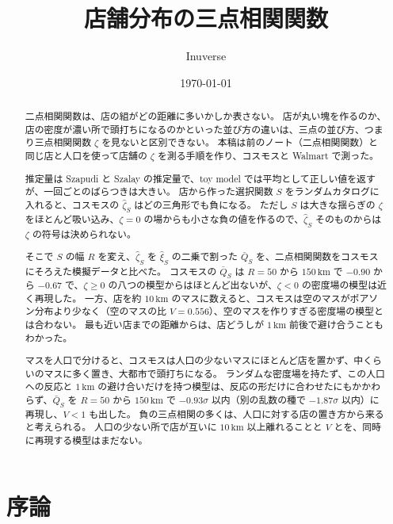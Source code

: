 \documentclass[a4paper,11pt]{ltjsarticle}
\title{\textbf{店舗分布の三点相関関数}}
\author{Inuverse}
\date{\today}
\begin{document}
\maketitle

\begin{abstract}
二点相関関数は、店の組がどの距離に多いかしか表さない。
店が丸い塊を作るのか、店の密度が濃い所で頭打ちになるのかといった並び方の違いは、三点の並び方、つまり三点相関関数 $\zeta$ を見ないと区別できない。
本稿は前のノート（二点相関関数）と同じ店と人口を使って店舗の $\zeta$ を測る手順を作り、コスモスと Walmart で測った。

推定量は Szapudi と Szalay の推定量で、toy model では平均として正しい値を返すが、一回ごとのばらつきは大きい。
店から作った選択関数 $S$ をランダムカタログに入れると、コスモスの $\hat\zeta_S$ はどの三角形でも負になる。
ただし $S$ は大きな揺らぎの $\zeta$ をほとんど吸い込み、$\zeta = 0$ の場からも小さな負の値を作るので、$\hat\zeta_S$ そのものからは $\zeta$ の符号は決められない。

そこで $S$ の幅 $R$ を変え、$\hat\zeta_S$ を $\hat\xi_S$ の二乗で割った $\bar Q_S$ を、二点相関関数をコスモスにそろえた模擬データと比べた。
コスモスの $\bar Q_S$ は $R = 50$ から $150\,\mathrm{km}$ で $-0.90$ から $-0.67$ で、$\zeta \ge 0$ の八つの模型からはほとんど出ないが、$\zeta < 0$ の密度場の模型は近く再現した。
一方、店を約 $10\,\mathrm{km}$ のマスに数えると、コスモスは空のマスがポアソン分布より少なく（空のマスの比 $V = 0.556$）、空のマスを作りすぎる密度場の模型とは合わない。
最も近い店までの距離からは、店どうしが $1\,\mathrm{km}$ 前後で避け合うこともわかった。

マスを人口で分けると、コスモスは人口の少ないマスにほとんど店を置かず、中くらいのマスに多く置き、大都市で頭打ちになる。
ランダムな密度場を持たず、この人口への反応と $1\,\mathrm{km}$ の避け合いだけを持つ模型は、反応の形だけに合わせたにもかかわらず、$\bar Q_S$ を $R = 50$ から $150\,\mathrm{km}$ で $-0.93\sigma$ 以内（別の乱数の種で $-1.87\sigma$ 以内）に再現し、$V < 1$ も出した。
負の三点相関の多くは、人口に対する店の置き方から来ると考えられる。
人口の少ない所で店が互いに $10\,\mathrm{km}$ 以上離れることと $V$ とを、同時に再現する模型はまだない。
\end{abstract}

\clearpage
\tableofcontents
\clearpage

\section{序論}
\label{sec:intro}
\end{document}
